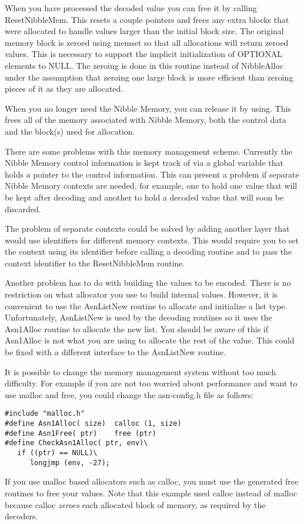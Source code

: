 When you have processed the decoded value you can free it by calling
{\C ResetNibbleMem}.  This resets a couple pointers and frees any
extra blocks that were allocated to handle values larger than the
initial block size.  The original memory block is zeroed
using {\C memset} so that all allocations will return zeroed values.
This is necessary to support the implicit initialization of OPTIONAL
elements to NULL\@.  The zeroing is done in this routine instead of
{\C NibbleAlloc} under the assumption that zeroing one large block
is more efficient than zeroing pieces of it as they are allocated.

When you no longer need the Nibble Memory, you can release it by
using.  This frees all of the
memory associated with Nibble Memory, both the control data and the
block(s) used for allocation.

There are some problems with this memory management scheme.  Currently
the Nibble Memory control information is kept track of via a global
variable that holds a pointer to the control information.  This can
present a problem if separate Nibble Memory contexts are needed, for
example, one to hold one value that will be kept after decoding and
another to hold a decoded value that will soon be discarded.

The problem of separate contexts could be solved by adding another
layer that would use identifiers for different memory contexts.  This
would require you to set the context using its identifier before
calling a decoding routine and to pass the context identifier to the
{\C ResetNibbleMem} routine.

Another problem has to do with building the values to be encoded.
There is no restriction on what allocator you use to build internal
values.  However, it is convenient to use the {\C AsnListNew}
routine to allocate and initialize a list type.  Unfortunately,
{\C AsnListNew} is used by the decoding routines so it uses the
{\C Asn1Alloc} routine to allocate the new list.  You should be
aware of this if {\C Asn1Alloc} is not what you are using to
allocate the rest of the value. This could be fixed with a different
interface to the {\C AsnListNew} routine.

It is possible to change the memory management system without too much
difficulty.  For example if you are not too worried about performance
and want to use {\C malloc} and {\C free}, you could change the
{\ufn asn-config.h} file as follows:
\begin{verbatim}
#include "malloc.h"
#define Asn1Alloc( size)  calloc (1, size)
#define Asn1Free( ptr)    free (ptr)
#define CheckAsn1Alloc( ptr, env)\
   if ((ptr) == NULL)\
      longjmp (env, -27);
\end{verbatim}
If you use {\C malloc} based allocators such as {\C calloc}, you
must use the generated free routines to free your values.  Note that
this example used {\C calloc} instead of {\C malloc} because
{\C calloc} {\em zeroes} each allocated block of memory, as required
by the decoders.


